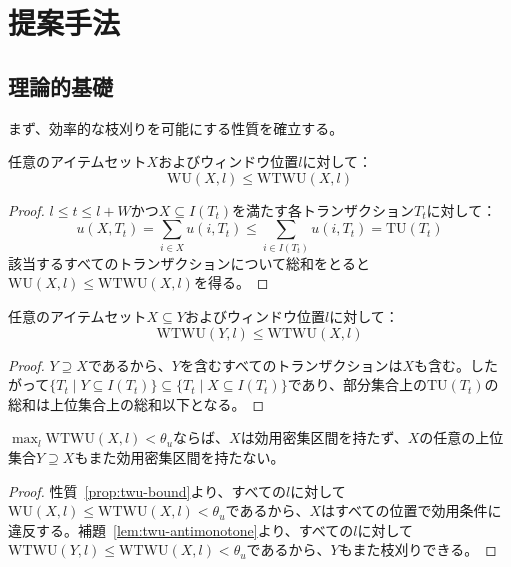 \section{提案手法}
\label{sec:method}

\subsection{理論的基礎}

まず、効率的な枝刈りを可能にする性質を確立する。

\begin{property}[TWU上界]
\label{prop:twu-bound}
任意のアイテムセット$X$およびウィンドウ位置$l$に対して：
\begin{equation}
    \text{WU}(X, l) \leq \text{WTWU}(X, l)
\end{equation}
\end{property}

\begin{proof}
$l \leq t \leq l + W$かつ$X \subseteq I(T_t)$を満たす各トランザクション$T_t$に対して：
\[
u(X, T_t) = \sum_{i \in X} u(i, T_t) \leq \sum_{i \in I(T_t)} u(i, T_t) = \text{TU}(T_t)
\]
該当するすべてのトランザクションについて総和をとると$\text{WU}(X, l) \leq \text{WTWU}(X, l)$を得る。
\end{proof}

\begin{lemma}[WTWUの反単調性]
\label{lem:twu-antimonotone}
任意のアイテムセット$X \subseteq Y$およびウィンドウ位置$l$に対して：
\begin{equation}
    \text{WTWU}(Y, l) \leq \text{WTWU}(X, l)
\end{equation}
\end{lemma}

\begin{proof}
$Y \supseteq X$であるから、$Y$を含むすべてのトランザクションは$X$も含む。したがって$\{T_t \mid Y \subseteq I(T_t)\} \subseteq \{T_t \mid X \subseteq I(T_t)\}$であり、部分集合上の$\text{TU}(T_t)$の総和は上位集合上の総和以下となる。
\end{proof}

\begin{theorem}[UDI枝刈り]
\label{thm:pruning}
$\max_{l} \text{WTWU}(X, l) < \theta_u$ならば、$X$は効用密集区間を持たず、$X$の任意の上位集合$Y \supseteq X$もまた効用密集区間を持たない。
\end{theorem}

\begin{proof}
性質~\ref{prop:twu-bound}より、すべての$l$に対して$\text{WU}(X, l) \leq \text{WTWU}(X, l) < \theta_u$であるから、$X$はすべての位置で効用条件に違反する。補題~\ref{lem:twu-antimonotone}より、すべての$l$に対して$\text{WTWU}(Y, l) \leq \text{WTWU}(X, l) < \theta_u$であるから、$Y$もまた枝刈りできる。
\end{proof}

